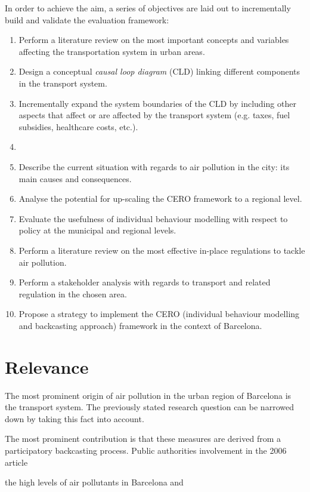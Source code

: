 In order to achieve the aim, a series of objectives are laid out to incrementally build and validate the evaluation framework:
%
\begin{enumerate}[label=(\alph*)]
	\item Perform a literature review on the most important concepts and variables affecting the transportation system in urban areas.
	\item Design a conceptual \textit{causal loop diagram} (CLD) linking different components in the transport system.
	\item Incrementally expand the system boundaries of the CLD by including other aspects that affect or are affected by the transport system (e.g. taxes, fuel subsidies, healthcare costs, etc.).
	\item 
	
	\item Describe the current situation with regards to air pollution in the city: its main causes and consequences.
	\item Analyse the potential for up-scaling the CERO framework to a regional level.
	\item Evaluate the usefulness of individual behaviour modelling with respect to policy at the municipal and regional levels.
	\item Perform a literature review on the most effective in-place regulations to tackle air pollution.
	\item Perform a stakeholder analysis with regards to transport and related regulation in the chosen area.
	\item Propose a strategy to implement the CERO (individual behaviour modelling and backcasting approach) framework in the context of Barcelona.
\end{enumerate}

\section{Relevance}
\label{s:relevance}

The most prominent origin of air pollution in the urban region of Barcelona is the transport system. The previously stated research question can be narrowed down by taking this fact into account. 

The most prominent contribution is that these measures are derived from a participatory backcasting process. Public authorities involvement in the 2006 article

the high levels of air pollutants in Barcelona and

